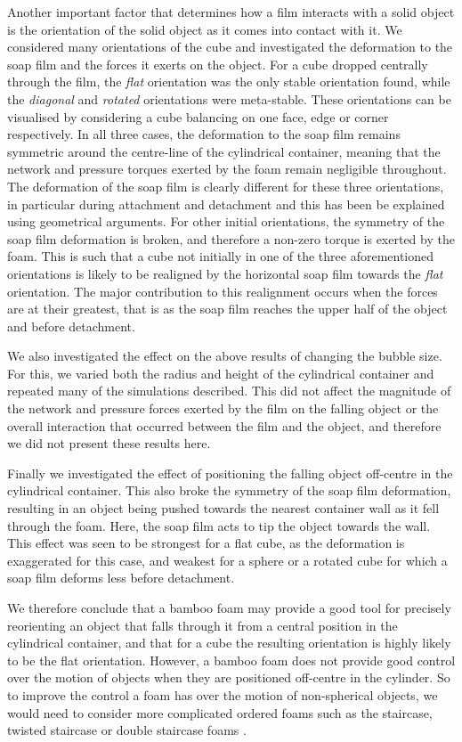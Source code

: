 \documentclass[preprint]{revtex4-1}
\begin{document}
Another important factor that determines how a film interacts with a solid object is the orientation of the solid object as it comes into contact with it. We considered many orientations of the cube and investigated the deformation to the soap film and the forces it exerts on the object. For a cube dropped centrally through the film, the \emph{flat} orientation was the only stable orientation found, while the \emph{diagonal} and \emph{rotated} orientations were meta-stable. These orientations can be visualised by considering a cube balancing on one face, edge or corner respectively. In all three cases, the deformation to the soap film remains symmetric around the centre-line of the cylindrical container, meaning that the network and pressure torques exerted by the foam remain negligible throughout. The deformation of the soap film is clearly different for these three orientations, in particular during attachment and detachment and this has been be explained using geometrical arguments. For other initial orientations, the symmetry of the soap film deformation is broken, and therefore a non-zero torque is exerted by the foam. This is such that a cube not initially in one of the three aforementioned orientations is likely to be realigned by the horizontal soap film towards the \emph{flat} orientation. The major contribution to this realignment occurs when the forces are at their greatest, that is as the soap film reaches the upper half of the object and before detachment.   

We also investigated the effect on the above results of changing the bubble size. For this, we varied both the radius and height of the cylindrical container and repeated many of the simulations described. This did not affect the magnitude of the network and pressure forces exerted by the film on the falling object or the overall interaction that occurred between the film and the object, and therefore we did not present these results here.  

Finally we investigated the effect of positioning the falling object off-centre in the cylindrical container. This also broke the symmetry of the soap film deformation, resulting in an object being pushed towards the nearest container wall as it fell through the foam. Here, the soap film acts to tip the object towards the wall. This effect was seen to be strongest for a flat cube, as the deformation is exaggerated for this case, and weakest for a sphere or a rotated cube for which a soap film deforms less before detachment. 


We therefore conclude that a bamboo foam may provide a good tool for precisely reorienting an object that falls through it from a central position in the cylindrical container, and that for a cube the resulting orientation is highly likely to be the flat orientation. However, a bamboo foam does not provide good control over the motion of objects when they are positioned off-centre in the cylinder. So to improve the control a foam has over the motion of non-spherical objects, we would need to consider more complicated ordered foams such as the staircase, twisted staircase or double staircase foams \cite{Davies12}. 
\end{document}

